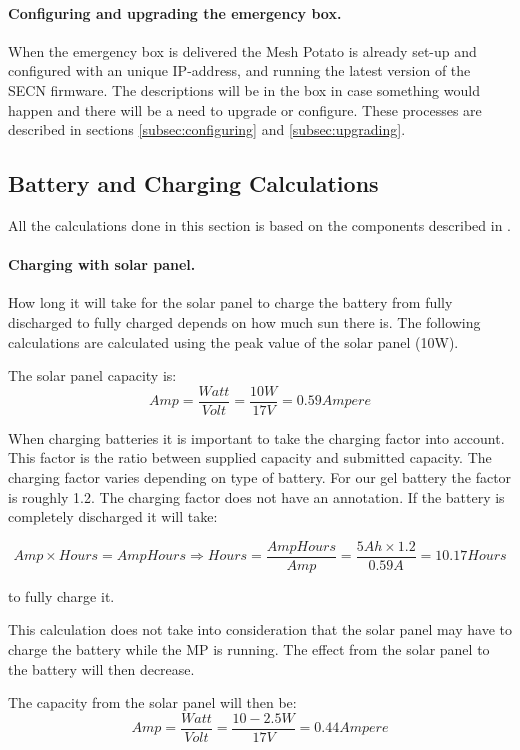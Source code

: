 \paragraph{Configuring and upgrading the emergency box.}
When the emergency box is delivered the Mesh Potato is already set-up and configured with an unique IP-address, and running the latest version of the SECN firmware. The descriptions will be in the box in case something would happen and there will be a need to upgrade or configure. These processes are described in sections \ref{subsec:configuring} and \ref{subsec:upgrading}.

\subsection{Battery and Charging Calculations}
All the calculations done in this section is based on the components described in . 

\paragraph{Charging with solar panel.}
How long it will take for the solar panel to charge the battery from fully discharged to fully charged depends on how much sun there is. The following calculations are calculated using the peak value of the solar panel (10W). 

The solar panel capacity is:
$$Amp = \frac{Watt}{Volt} = \frac{10 W}{17 V} = 0.59 Ampere$$

When charging batteries it is important to take the charging factor into account. This factor is the ratio between supplied capacity and submitted capacity. The charging factor varies depending on type of battery. For our gel battery the factor is roughly 1.2. The charging factor does not have an annotation. 
If the battery is completely discharged it will take: 

$$Amp\times Hours = AmpHours \Rightarrow Hours =\frac{AmpHours}{Amp} = \frac{5 Ah\times 1.2}{0.59 A} = 10.17 Hours$$

to fully charge it. 

This calculation does not take into consideration that the solar panel may have to charge the battery while the MP is running. The effect from the solar panel to the battery will then decrease. 

The capacity from the solar panel will then be: 
$$Amp = \frac{Watt}{Volt} = \frac{10-2.5 W}{17 V} = 0.44 Ampere$$

